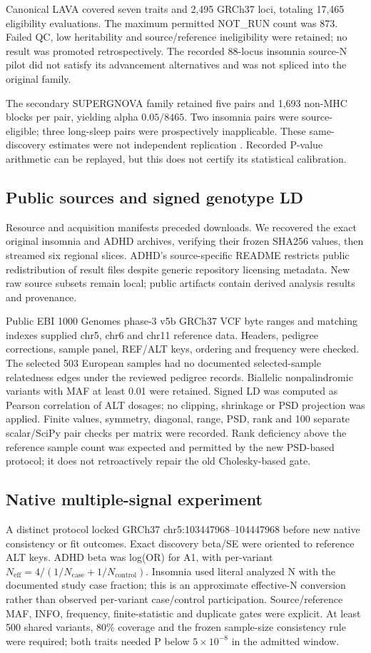 \documentclass[11pt]{article}
\begin{document}
Canonical LAVA covered seven traits and 2,495 GRCh37 loci, totaling 17,465 eligibility evaluations. The maximum permitted NOT\_RUN count was 873. Failed QC, low heritability and source/reference ineligibility were retained; no result was promoted retrospectively. The recorded 88-locus insomnia source-N pilot did not satisfy its advancement alternatives and was not spliced into the original family.

The secondary SUPERGNOVA family retained five pairs and 1,693 non-MHC blocks per pair, yielding alpha $0.05/8465$. Two insomnia pairs were source-eligible; three long-sleep pairs were prospectively inapplicable. These same-discovery estimates were not independent replication \cite{supergnova}. Recorded P-value arithmetic can be replayed, but this does not certify its statistical calibration.

\subsection*{Public sources and signed genotype LD}
Resource and acquisition manifests preceded downloads. We recovered the exact original insomnia and ADHD archives, verifying their frozen SHA256 values, then streamed six regional slices. ADHD's source-specific README restricts public redistribution of result files despite generic repository licensing metadata. New raw source subsets remain local; public artifacts contain derived analysis results and provenance.

Public EBI 1000 Genomes phase-3 v5b GRCh37 VCF byte ranges and matching indexes supplied chr5, chr6 and chr11 reference data. Headers, pedigree corrections, sample panel, REF/ALT keys, ordering and frequency were checked. The selected 503 European samples had no documented selected-sample relatedness edges under the reviewed pedigree records. Biallelic nonpalindromic variants with MAF at least 0.01 were retained. Signed LD was computed as Pearson correlation of ALT dosages; no clipping, shrinkage or PSD projection was applied. Finite values, symmetry, diagonal, range, PSD, rank and 100 separate scalar/SciPy pair checks per matrix were recorded. Rank deficiency above the reference sample count was expected and permitted by the new PSD-based protocol; it does not retroactively repair the old Cholesky-based gate.

\subsection*{Native multiple-signal experiment}
A distinct protocol locked GRCh37 chr5:103447968--104447968 before new native consistency or fit outcomes. Exact discovery beta/SE were oriented to reference ALT keys. ADHD beta was log(OR) for A1, with per-variant $N_{\mathrm{eff}}=4/(1/N_{\mathrm{case}}+1/N_{\mathrm{control}})$. Insomnia used literal analyzed N with the documented study case fraction; this is an approximate effective-N conversion rather than observed per-variant case/control participation. Source/reference MAF, INFO, frequency, finite-statistic and duplicate gates were explicit. At least 500 shared variants, 80\% coverage and the frozen sample-size consistency rule were required; both traits needed P below $5\times10^{-8}$ in the admitted window.
\end{document}
